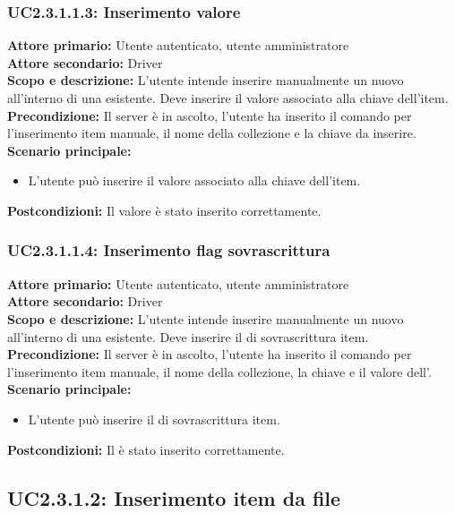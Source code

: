 \documentclass{scalatekids-article}
\begin{document}
\subsubsection{UC2.3.1.1.3: Inserimento valore}

\textbf{Attore primario:} Utente autenticato, utente amministratore\\
\textbf{Attore secondario:} Driver\\
\textbf{Scopo e descrizione:} L'utente intende inserire manualmente un nuovo  all'interno di una  esistente. Deve inserire il valore associato alla chiave dell'item.\\
\textbf{Precondizione:} Il server è in ascolto, l'utente ha inserito il comando per l'inserimento item manuale, il nome della collezione e la chiave da inserire.\\
\textbf{Scenario principale:}
\begin{itemize}
\item L'utente può inserire il valore associato alla chiave dell'item.
\end{itemize}
\textbf{Postcondizioni:} Il valore è stato inserito correttamente.

\subsubsection{UC2.3.1.1.4: Inserimento flag sovrascrittura}

\textbf{Attore primario:} Utente autenticato, utente amministratore\\
\textbf{Attore secondario:} Driver\\
\textbf{Scopo e descrizione:} L'utente intende inserire manualmente un nuovo  all'interno di una  esistente. Deve inserire il  di sovrascrittura item.\\
\textbf{Precondizione:} Il server è in ascolto, l'utente ha inserito il comando per l'inserimento item manuale, il nome della collezione, la chiave e il valore dell'.\\
\textbf{Scenario principale:}
\begin{itemize}
\item L'utente può inserire il  di sovrascrittura item.
\end{itemize}
\textbf{Postcondizioni:} Il  è stato inserito correttamente.

\subsection{UC2.3.1.2: Inserimento item da file}
\end{document}

